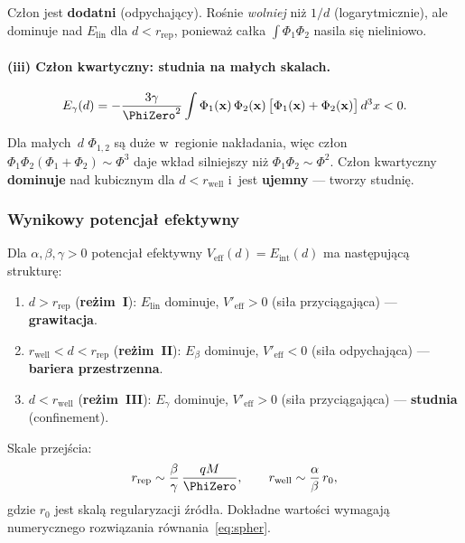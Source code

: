 Cz\l{}on jest \textbf{dodatni} (odpychaj\k{a}cy). Ro\'snie
\emph{wolniej} ni\.z $1/d$ (logarytmicznie), ale dominuje
nad $E_{\mathrm{lin}}$ dla $d < r_{\mathrm{rep}}$, poniewa\.z
ca\l{}ka $\int\Phi_1\Phi_2$ nasila si\k{e} nieliniowo.

\paragraph{(iii) Cz\l{}on kwartyczny: studnia na ma\l{}ych skalach.}

\begin{equation}\label{eq:Egamma}
  E_{\gamma}(d)
  = -\frac{3\gamma}{\PhiZero^2}\int \Phi_1(\mathbf{x})\,
    \Phi_2(\mathbf{x})\,\bigl[\Phi_1(\mathbf{x})+\Phi_2(\mathbf{x})\bigr]
    \,d^3x
  < 0.
\end{equation}

Dla ma\l{}ych~$d$ $\Phi_{1,2}$ s\k{a} du\.ze w~regionie nak\l{}adania,
wi\k{e}c cz\l{}on $\Phi_1\Phi_2(\Phi_1+\Phi_2) \sim \Phi^3$ daje
wk\l{}ad silniejszy ni\.z $\Phi_1\Phi_2 \sim \Phi^2$. Cz\l{}on
kwartyczny \textbf{dominuje} nad kubicznym dla $d < r_{\mathrm{well}}$
i~jest \textbf{ujemny} --- tworzy studni\k{e}.

\subsubsection{Wynikowy potencja\l{} efektywny}

\begin{theorem}\label{thm:three-regimes}
Dla $\alpha, \beta, \gamma > 0$ potencja\l{} efektywny
$V_{\mathrm{eff}}(d) = E_{\mathrm{int}}(d)$ ma nast\k{e}puj\k{a}c\k{a}
struktur\k{e}:
\begin{enumerate}[nosep]
  \item \textbf{$d > r_{\mathrm{rep}}$} (\textbf{re\.zim~I}):
    $E_{\mathrm{lin}}$ dominuje, $V'_{\mathrm{eff}} > 0$
    (si\l{}a przyci\k{a}gaj\k{a}ca) --- \textbf{grawitacja}.
  \item \textbf{$r_{\mathrm{well}} < d < r_{\mathrm{rep}}$}
    (\textbf{re\.zim~II}):
    $E_{\beta}$ dominuje, $V'_{\mathrm{eff}} < 0$
    (si\l{}a odpychaj\k{a}ca) --- \textbf{bariera przestrzenna}.
  \item \textbf{$d < r_{\mathrm{well}}$} (\textbf{re\.zim~III}):
    $E_{\gamma}$ dominuje, $V'_{\mathrm{eff}} > 0$
    (si\l{}a przyci\k{a}gaj\k{a}ca) --- \textbf{studnia} (confinement).
\end{enumerate}
Skale przej\'scia:
\begin{equation}\label{eq:scales}
  r_{\mathrm{rep}} \sim \frac{\beta}{\gamma}\,
    \frac{q M}{\PhiZero}, \qquad
  r_{\mathrm{well}} \sim \frac{\alpha}{\beta}\,r_0,
\end{equation}
gdzie $r_0$ jest skal\k{a} regularyzacji \'zr\'od\l{}a.
Dok\l{}adne warto\'sci wymagaj\k{a} numerycznego rozwi\k{a}zania
r\'ownania~\eqref{eq:spher}.
\end{theorem}

